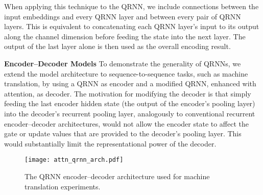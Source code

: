 \documentclass{article} \usepackage{iclr2017_conference,times}
\begin{document}
When applying this technique to the QRNN, we include connections between the input embeddings and every QRNN layer and between every pair of QRNN layers. This is equivalent to concatenating each QRNN layer's input to its output along the channel dimension before feeding the state into the next layer. The output of the last layer alone is then used as the overall encoding result.

\textbf{Encoder--Decoder Models} \label{sec:seq2seq}
To demonstrate the generality of QRNNs, we extend the model architecture to sequence-to-sequence tasks, such as machine translation, by using a QRNN as encoder and a modified QRNN, enhanced with attention, as decoder. The motivation for modifying the decoder is that simply feeding the last encoder hidden state (the output of the encoder's pooling layer) into the decoder's recurrent pooling layer, analogously to conventional recurrent encoder--decoder architectures, would not allow the encoder state to affect the gate or update values that are provided to the decoder's pooling layer. This would substantially limit the representational power of the decoder.
\begin{figure}
\centering
\texttt{[image: attn\_qrnn\_arch.pdf]}
\caption{The QRNN encoder--decoder architecture used for machine translation experiments.}
\end{figure}
\end{document}
